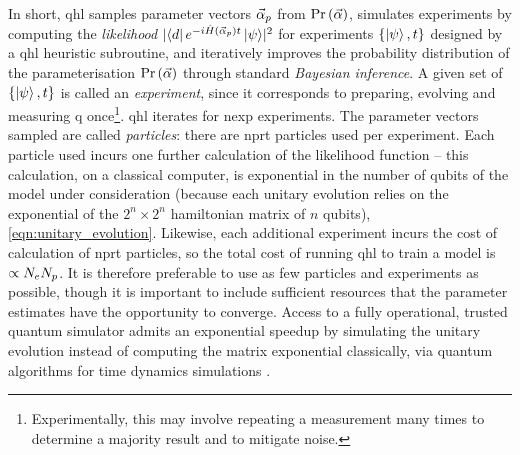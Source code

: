 In short, \gls{qhl} samples parameter vectors $\vec{\alpha}_p$ from $\Pr\left(\vec{\alpha}\right)$, 
simulates \glspl{experiment} by computing the \emph{likelihood} $\lvert \bra{d} e^{-i \hat{H}(\vec{\alpha}_p)t} \ket{\psi} \rvert^2$
for \glspl{experiment} $\{\ket{\psi}, t\}$ designed by a \gls{qhl} heuristic subroutine, 
and iteratively improves the probability distribution of the parameterisation $\Pr\left(\vec{\alpha}\right)$ 
through standard \emph{Bayesian inference}. 
A given set of $\{\ket{\psi}, t\}$ is called an \emph{experiment}, since it corresponds to preparing, evolving and measuring \gls{q} 
once\footnote{Experimentally, this may involve repeating a measurement many times to determine a majority result and to mitigate noise.}. 
\gls{qhl} iterates for \gls{nexp} \glspl{experiment}. 
The parameter vectors sampled are called \emph{\glspl{particle}}: there are \gls{nprt} \glspl{particle} used per experiment. 
Each \gls{particle} used incurs one further calculation of the \gls{likelihood} function -- 
this calculation, on a classical computer, is exponential in the number of qubits of the model under consideration
(because each unitary evolution relies on the exponential of the $2^n \times 2^n$ \gls{hamiltonian} matrix of $n$ qubits), 
\cref{eqn:unitary_evolution}. 
Likewise, each additional \gls{experiment} incurs the cost of calculation of \gls{nprt} \glspl{particle}, 
so the total cost of running \gls{qhl} to train a model is $\propto N_e N_p$.
It is therefore preferable to use as few \glspl{particle} and \glspl{experiment} as possible, 
though it is important to include sufficient resources that the parameter estimates have the opportunity to converge. 
Access to a fully operational, trusted quantum simulator admits an exponential 
speedup by simulating the unitary evolution instead of computing the matrix exponential classically, 
via quantum algorithms for time dynamics simulations \cite{childs2018toward, kivlichan2017bounding, childs2012hamiltonian}.
\par 

